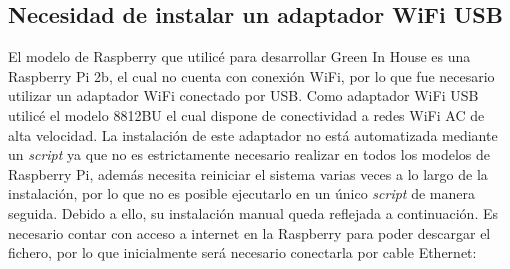     \subsection{Necesidad de instalar un adaptador WiFi USB}  
    El modelo de Raspberry que utilicé para desarrollar Green In House es una Raspberry Pi 2b, el cual no cuenta con conexión WiFi, por lo que fue necesario utilizar un adaptador WiFi conectado por USB. Como adaptador WiFi USB utilicé el modelo 8812BU el cual dispone de conectividad a redes WiFi AC de alta velocidad. La instalación de este adaptador no está automatizada mediante un \textit{script} ya que no es estrictamente necesario realizar en todos los modelos de Raspberry Pi, además necesita reiniciar el sistema varias veces a lo largo de la instalación, por lo que no es posible ejecutarlo en un único \textit{script} de manera seguida. Debido a ello, su instalación manual queda reflejada a continuación. Es necesario contar con acceso a internet en la Raspberry para poder descargar el fichero, por lo que inicialmente será necesario conectarla por cable Ethernet:
